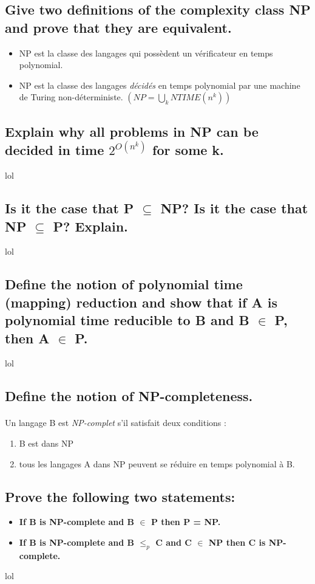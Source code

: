 \subsection{Give two definitions of the complexity class NP and prove that they are equivalent.}
\begin{itemize}
\item NP est la classe des langages qui possèdent un vérificateur en temps polynomial.
\item NP est la classe des langages \textit{décidés} en temps polynomial par une machine de Turing non-déterministe. $(NP = \bigcup_{k} NTIME(n^{k}))$
\end{itemize}

\subsection{Explain why all problems in NP can be decided in time $2^{O(n^{k})}$ for some k.}
lol

\subsection{Is it the case that P $\subseteq$ NP? Is it the case that NP $\subseteq$ P? Explain.}
lol

\subsection{Define the notion of polynomial time (mapping) reduction and show that if A is polynomial time reducible to B and B $\in$ P, then A $\in$ P.}
lol

\subsection{Define the notion of NP-completeness.}
\paragraph{}
Un langage B est \textit{NP-complet} s'il satisfait deux conditions :
\begin{enumerate}
  \item B est dans NP
  \item tous les langages A dans NP peuvent se réduire en temps polynomial à B.
\end{enumerate}

\subsection{Prove the following two statements:}
	\begin{itemize}
		\item \textbf{If B is NP-complete and B $\in$ P then P = NP.}
		\item \textbf{If B is NP-complete and B $\leq_{p}$ C and C $\in$ NP then C is NP-complete.}
	\end{itemize}
lol


